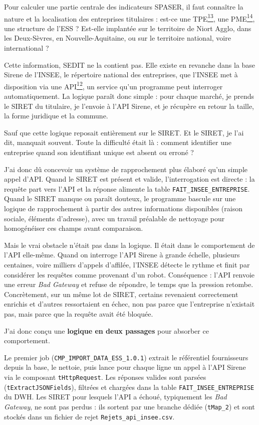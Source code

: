 \documentclass[11pt,a4paper]{article}
\newcommand{\lexref}[1]{\hyperlink{lex:#1}{\textsuperscript{#1}}}
\begin{document}
Pour calculer une partie centrale des indicateurs SPASER, il faut connaître la nature et la localisation des entreprises titulaires : est-ce une TPE\lexref{13}, une PME\lexref{14}, une structure de l'ESS ? Est-elle implantée sur le territoire de Niort Agglo, dans les Deux-Sèvres, en Nouvelle-Aquitaine, ou sur le territoire national, voire international ?

Cette information, SEDIT ne la contient pas. Elle existe en revanche dans la base Sirene de l'INSEE, le répertoire national des entreprises, que l'INSEE met à disposition via une API\lexref{12}, un service qu'un programme peut interroger automatiquement. La logique paraît donc simple : pour chaque marché, je prends le SIRET du titulaire, je l'envoie à l'API Sirene, et je récupère en retour la taille, la forme juridique et la commune.

Sauf que cette logique reposait entièrement sur le SIRET. Et le SIRET, je l'ai dit, manquait souvent. Toute la difficulté était là : comment identifier une entreprise quand son identifiant unique est absent ou erroné ?

J'ai donc dû concevoir un système de rapprochement plus élaboré qu'un simple appel d'API. Quand le SIRET est présent et valide, l'interrogation est directe : la requête part vers l'API et la réponse alimente la table \texttt{FAIT\_INSEE\_ENTREPRISE}. Quand le SIRET manque ou paraît douteux, le programme bascule sur une logique de rapprochement à partir des autres informations disponibles (raison sociale, éléments d'adresse), avec un travail préalable de nettoyage pour homogénéiser ces champs avant comparaison.

Mais le vrai obstacle n'était pas dans la logique. Il était dans le comportement de l'API elle-même. Quand on interroge l'API Sirene à grande échelle, plusieurs centaines, voire milliers d'appels d'affilée, l'INSEE détecte le rythme et finit par considérer les requêtes comme provenant d'un robot. Conséquence : l'API renvoie une erreur \emph{Bad Gateway} et refuse de répondre, le temps que la pression retombe. Concrètement, sur un même lot de SIRET, certains revenaient correctement enrichis et d'autres ressortaient en échec, non pas parce que l'entreprise n'existait pas, mais parce que la requête avait été bloquée.

J'ai donc conçu une \textbf{logique en deux passages} pour absorber ce comportement.

Le premier job (\texttt{CMP\_IMPORT\_DATA\_ESS\_1.0.1}) extrait le référentiel fournisseurs depuis la base, le nettoie, puis lance pour chaque ligne un appel à l'API Sirene via le composant \texttt{tHttpRequest}. Les réponses valides sont parsées (\texttt{tExtractJSONFields}), filtrées et chargées dans la table \texttt{FAIT\_INSEE\_ENTREPRISE} du DWH. Les SIRET pour lesquels l'API a échoué, typiquement les \emph{Bad Gateway}, ne sont pas perdus : ils sortent par une branche dédiée (\texttt{tMap\_2}) et sont stockés dans un fichier de rejet \texttt{Rejets\_api\_insee.csv}.
\end{document}
